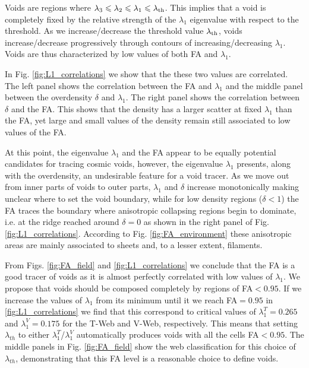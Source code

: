 \documentclass[a4,useAMS,usenatbib,usegraphicx]{mn2e}
\begin{document}
Voids are regions where $\lambda_3\leq\lambda_2\leq
\lambda_1\leq\lambda_{\rm th}$. 
This implies that a void is completely fixed by the relative strength
of the $\lambda_1$ eigenvalue with respect to the threshold.   
As we increase/decrease the threshold value $\lambda_{\rm th}$, voids
increase/decrease progressively through contours of
increasing/decreasing $\lambda_1$.  
Voids are thus characterized by low values of both FA and
$\lambda_1$.  


In Fig. \ref{fig:L1_correlations}  we show that the these two values
are correlated. 
The left panel shows the correlation between the FA and $\lambda_1$
and the middle panel between the overdensity $\delta$ and $\lambda_1$.
The right panel shows the correlation between $\delta$ and the
FA. 
This shows that the  density has a larger scatter at fixed
$\lambda_1$ than the FA, yet large and  small values of the density
remain still associated to low values of the FA. 


At this point, the eigenvalue $\lambda_1$ and the FA appear to be
equally potential candidates for tracing cosmic voids, however, the 
eigenvalue $\lambda_1$ presents, along with the overdensity, an undesirable 
feature for a void tracer. 
As we move out from inner parts of voids to outer parts, $\lambda_1$
and $\delta$ increase monotonically making unclear where to set the
void boundary, while for low density regions ($\delta<1$) the FA traces
the boundary where anisotropic collapsing regions begin to 
dominate, i.e. at the ridge reached around $\delta = 0$ as shown in the 
right panel of Fig. \ref{fig:L1_correlations}.
According to Fig. \ref{fig:FA_environment} these anisotropic areas are
mainly associated to sheets and, to a lesser extent, filaments.

From Figs. \ref{fig:FA_field} and \ref{fig:L1_correlations} we
conclude that the FA is a good tracer of voids as it is almost perfectly
correlated with low values of $\lambda_1$. 
We propose that voids should be composed completely by regions of
FA$<0.95$.
If we increase the values of $\lambda_1$ from its minimum until it
we reach FA$=0.95$ in \ref{fig:L1_correlations} we find that this
correspond to critical values of $\lambda_{1}^T = 0.265$ and
$\lambda_{1}^V = 0.175$ for the T-Web and V-Web, respectively.
This means that setting $\lambda_{th}$ to either
$\lambda_{1}^T$/$\lambda_{1}^{V}$ automatically produces voids with
all the cells FA$<0.95$.   
The middle panels in Fig. \ref{fig:FA_field} show the web
classification for this choice of $\lambda_{th}$, demonstrating that
this FA level is a reasonable choice to define voids.
\end{document}
